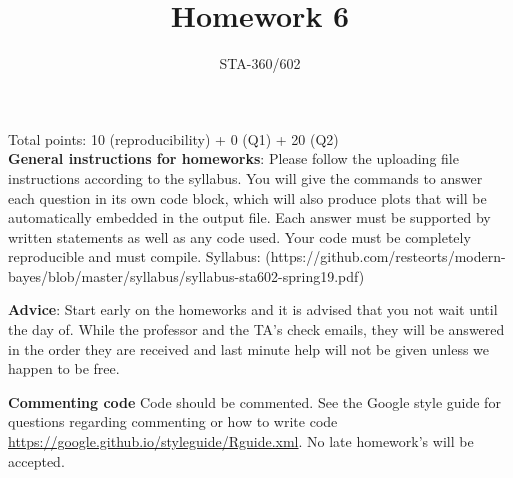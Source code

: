 \documentclass{article}
\begin{document}
\title{Homework 6}
\author{STA-360/602}
\date{}
\maketitle

Total points: 10 (reproducibility) + 0 (Q1) + 20 (Q2)\\

\textbf{General instructions for homeworks}: Please follow the uploading file instructions according to the syllabus. You will give the commands to answer each question in its own code block, which will also produce plots that will be automatically embedded in the output file. Each answer must be supported by written statements as well as any code used. Your code must be completely reproducible and must compile. Syllabus: (https://github.com/resteorts/modern-bayes/blob/master/syllabus/syllabus-sta602-spring19.pdf)

\textbf{Advice}: Start early on the homeworks and it is advised that you not wait until the day of. While the professor and the TA's check emails, they will be answered in the order they are received and last minute help will not be given unless we happen to be free.  

\textbf{Commenting code}
Code should be commented. See the Google style guide for questions regarding commenting or how to write 
code \url{https://google.github.io/styleguide/Rguide.xml}. No late homework's will be accepted.
\end{document}
